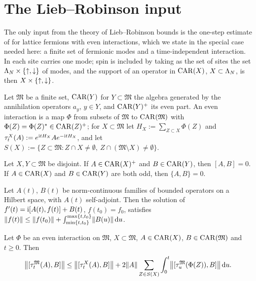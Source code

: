 \section{The Lieb--Robinson input}\label{app:LR}

The only input from the theory of Lieb--Robinson bounds is the one-step estimate of \cite{NSY18} for lattice
fermions with even interactions, which we state in the special case needed here: a finite set of fermionic
modes and a time-independent interaction. In \cite{NSY18} each site carries one mode; spin is included by
taking as the set of sites the set $\Lambda_N\times\{{\uparrow},{\downarrow}\}$ of modes, and the support of an operator in $\mathrm{CAR}(X)$,
$X\subset\Lambda_N$, is then $X\times\{{\uparrow},{\downarrow}\}$.

Let $\mathfrak M$ be a finite set, $\mathrm{CAR}(Y)$ for $Y\subset\mathfrak M$ the algebra generated by the annihilation operators
$a_y$, $y\in Y$, and $\mathrm{CAR}(Y)^+$ its even part. An even interaction is a map $\Phi$ from subsets of $\mathfrak M$ to
$\mathrm{CAR}(\mathfrak M)$ with $\Phi(Z)=\Phi(Z)^*\in\mathrm{CAR}(Z)^+$; for $X\subset\mathfrak M$ let $H_X:=\sum_{Z\subset X}\Phi(Z)$ and
$\tau^X_t(A):=e^{\mathrm{i} tH_X}Ae^{-\mathrm{i} tH_X}$, and let $S(X):=\{Z\subset\mathfrak M:Z\cap X\ne\emptyset,\ Z\cap(\mathfrak M\setminus X)\ne\emptyset\}$.

\begin{proposition}\label{prop:nsy-disjoint}
Let $X,Y\subset\mathfrak M$ be disjoint. If $A\in\mathrm{CAR}(X)^+$ and $B\in\mathrm{CAR}(Y)$, then $[A,B]=0$. If $A\in\mathrm{CAR}(X)$ and
$B\in\mathrm{CAR}(Y)$ are both odd, then $\{A,B\}=0$.
\end{proposition}

\begin{lemma}\label{lem:nsy-ode}
Let $A(t)$, $B(t)$ be norm-continuous families of bounded operators on a Hilbert space, with $A(t)$
self-adjoint. Then the solution of $f'(t)=\mathrm{i}[A(t),f(t)]+B(t)$, $f(t_0)=f_0$, satisfies
$\lVert f(t)\rVert\le\lVert f(t_0)\rVert+\int_{\min\{t,t_0\}}^{\max\{t,t_0\}}\lVert B(u)\rVert\,\mathrm{d} u$.
\end{lemma}

\begin{lemma}\label{lem:nsy-onestep}
Let $\Phi$ be an even interaction on $\mathfrak M$, $X\subset\mathfrak M$, $A\in\mathrm{CAR}(X)$, $B\in\mathrm{CAR}(\mathfrak M)$ and $t\ge0$. Then
\[
\bigl\lVert[\tau^{\mathfrak M}_t(A),B]\bigr\rVert\le\bigl\lVert[\tau^X_t(A),B]\bigr\rVert
+2\lVert A\rVert\sum_{Z\in S(X)}\int_0^t\bigl\lVert[\tau^{\mathfrak M}_u(\Phi(Z)),B]\bigr\rVert\,\mathrm{d} u .
\]
\end{lemma}

